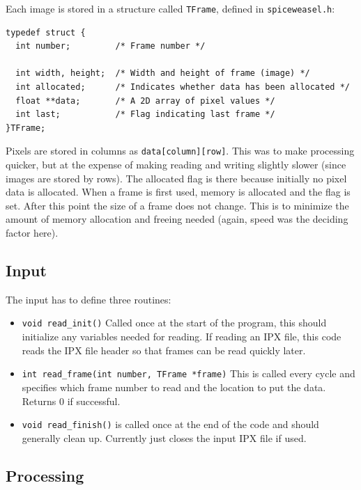 \documentclass[12pt, a4paper]{article}
\begin{document}
Each image is stored in a structure called \texttt{TFrame}, defined in
\texttt{spiceweasel.h}:

\begin{verbatim}
typedef struct {
  int number;         /* Frame number */
  
  int width, height;  /* Width and height of frame (image) */
  int allocated;      /* Indicates whether data has been allocated */
  float **data;       /* A 2D array of pixel values */
  int last;           /* Flag indicating last frame */
}TFrame;
\end{verbatim}

\noindent Pixels are stored in columns as \texttt{data[column][row]}. This was to
make processing quicker, but at the expense of making reading and writing slightly
slower (since images are stored by rows).
The allocated flag is there because initially no pixel data is allocated. When a frame
is first used, memory is allocated and the flag is set. After this point the size
of a frame does not change. This is to minimize the amount of memory allocation
and freeing needed (again, speed was the deciding factor here).

\subsection{Input}

The input has to define three routines:
\begin{itemize}
\item \texttt{void read\_init()} Called once at the start of the program, this
should initialize any variables needed for reading. If reading an IPX file, this
code reads the IPX file header so that frames can be read quickly later.
\item \texttt{int read\_frame(int number, TFrame *frame)} This is called every
cycle and specifies which frame number to read and the location to put the data.
Returns 0 if successful.
\item \texttt{void read\_finish()} is called once at the end of the code and should
generally clean up. Currently just closes the input IPX file if used.
\end{itemize}

\subsection{Processing}
\end{document}
